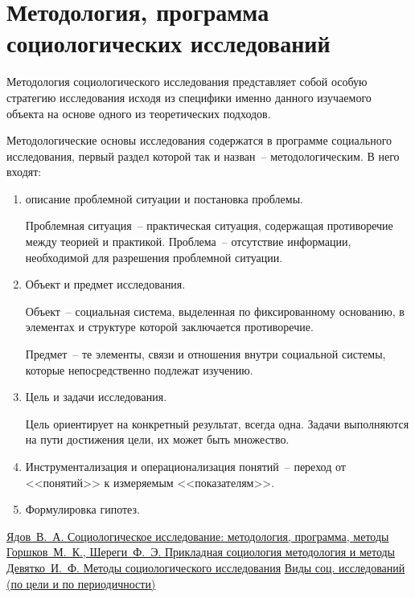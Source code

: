   \section{Методология, программа социологических исследований}

    Методология социологического исследования представляет собой особую
    стратегию исследования исходя из специфики именно данного изучаемого объекта
    на основе одного из теоретических подходов.

    Методологические основы исследования содержатся в программе социального
    исследования, первый раздел которой так и назван~-- методологическим. В него
    входят:
    \begin{enumerate}
      \item описание проблемной ситуации и постановка проблемы.

        Проблемная ситуация~-- практическая ситуация, содержащая противоречие
        между теорией и практикой. Проблема~-- отсутствие информации,
        необходимой для разрешения проблемной ситуации.
      \item Объект и предмет исследования.

        Объект~-- социальная система, выделенная по фиксированному основанию, в
        элементах и структуре которой заключается противоречие.

        Предмет~-- те элементы, связи и отношения внутри социальной системы,
        которые непосредственно подлежат изучению.
      \item Цель и задачи исследования.

        Цель ориентирует на конкретный результат, всегда одна. Задачи
        выполняются на пути достижения цели, их может быть множество.
      \item Инструментализация и операционализация понятий~-- переход от
        <<понятий>> к измеряемым <<показателям>>.
      \item Формулировка гипотез.
    \end{enumerate}

    \begin{thebibliography}{9}
       \href{http://socioline.ru/sites/default/modules/pubdlcnt/%
        pubdlcnt.php?file=http://socioline.ru/_seminar/library/metod/yadov/%
        met_SI.rar}{Ядов~В.~А. Социологическое исследование: методология,
        программа, методы}
       \href{http://padabum.com/x.php?id=78126}{Горшков~М.~К.,
        Шереги~Ф.~Э. Прикладная социология методология и методы}
       \href{http://www.soc.univ.kiev.ua/LIB/PUB/D/DEVIATKO/%
        deviatko.pdf}{Девятко~И.~Ф. Методы социологического исследования}
       \href{http://vk.cc/2iO5Xy}{Виды соц. исследований (по цели и
        по периодичности)}
    \end{thebibliography}
  
